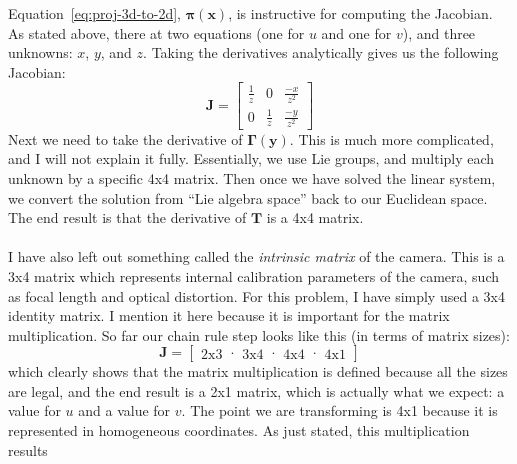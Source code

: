 \documentclass{article}
\begin{document}
Equation~\ref{eq:proj-3d-to-2d}, $\boldsymbol{\pi}(\mathbf{x})$, is
instructive for computing the Jacobian.  As stated above, there at two
equations (one for $u$ and one for $v$), and three unknowns: $x$, $y$,
and $z$.  Taking the derivatives analytically gives us the following
Jacobian:
\begin{equation}
  \label{eq:proj-jacobian}
  \mathbf{J} =
  \begin{bmatrix}
    \frac{1}{z} & 0 & \frac{-x}{z^2} \\
    0 & \frac{1}{z} & \frac{-y}{z^2}
  \end{bmatrix}
\end{equation}
Next we need to take the derivative of $\mathbf{\Gamma}(\mathbf{y})$.  This
is much more complicated, and I will not explain it fully.
Essentially, we use Lie groups, and multiply each unknown by a
specific 4x4 matrix.  Then once we have solved the linear system, we
convert the solution from ``Lie algebra space'' back to our Euclidean
space.  The end result is that the derivative of $\mathbf{T}$ is a 4x4
matrix.
\\
\\
I have also left out something called the \emph{intrinsic matrix} of
the camera.  This is a 3x4 matrix which represents internal
calibration parameters of the camera, such as focal length and optical
distortion.  For this problem, I have simply used a 3x4 identity
matrix.  I mention it here because it is important for the matrix
multiplication.  So far our chain rule step looks like this (in terms
of matrix sizes):
\begin{equation}
  \label{eq:T-matrix}
  \mathbf{J} =
  \left[
  \begin{array}{c}
      2 \textrm{x} 3
  \end{array}
  \cdot
  \begin{array}{c}
      3 \textrm{x} 4
  \end{array}
  \cdot
  \begin{array}{c}
      4 \textrm{x} 4
  \end{array}
  \cdot
  \begin{array}{c}
      4 \textrm{x} 1
  \end{array}
  \right]
\end{equation}
which clearly shows that the matrix multiplication is defined because
all the sizes are legal, and the end result is a 2x1 matrix, which is
actually what we expect: a value for $u$ and a value for $v$.  The
point we are transforming is 4x1 because it is represented in
homogeneous coordinates. As just stated, this multiplication results
\end{document}
